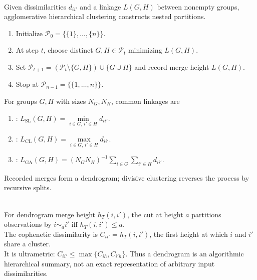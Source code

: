 \begin{method} \label{meth:sl-hierarchical-clustering} \\
Given dissimilarities $d_{ii'}$ and a linkage $L(G,H)$ between nonempty groups, agglomerative hierarchical clustering constructs nested partitions.
\begin{enumerate}[label=(\roman*)]
\setlength{\itemsep}{0pt}
\item Initialize $\mathcal P_0=\{\{1\},\ldots,\{n\}\}$.
\item At step $t$, choose distinct $G,H\in\mathcal P_t$ minimizing $L(G,H)$.
\item Set $\mathcal P_{t+1}=(\mathcal P_t\setminus\{G,H\})\cup\{G\cup H\}$ and record merge height $L(G,H)$.
\item Stop at $\mathcal P_{n-1}=\{\{1,\ldots,n\}\}$.
\end{enumerate}
For groups $G,H$ with sizes $N_G,N_H$, common linkages are
\begin{enumerate}[label=(\roman*)]
\setlength{\itemsep}{0pt}
\item {}: $L_{\mathrm{SL}}(G,H)=\min\limits_{i\in G,\,i'\in H}d_{ii'}$.
\item {}: $L_{\mathrm{CL}}(G,H)=\max\limits_{i\in G,\,i'\in H}d_{ii'}$.
\item {}: $L_{\mathrm{GA}}(G,H)=(N_GN_H)^{-1}\sum\limits_{i\in G}\sum\limits_{i'\in H}d_{ii'}$.
\end{enumerate}
Recorded merges form a dendrogram; divisive clustering reverses the process by recursive splits.
\end{method}

\begin{remark} \label{rem:sl-dendrogram-cophenetic-distances} \\
For dendrogram merge height $h_T(i,i')$, the cut at height $a$ partitions observations by $i\sim_a i'$ iff $h_T(i,i')\leq a$.\\
The cophenetic dissimilarity is $C_{ii'}=h_T(i,i')$, the first height at which $i$ and $i'$ share a cluster.\\
It is ultrametric: $C_{ii'}\leq\max\{C_{ih},C_{i'h}\}$. Thus a dendrogram is an algorithmic hierarchical summary, not an exact representation of arbitrary input dissimilarities.
\end{remark}

